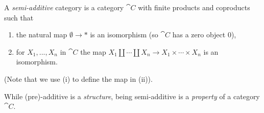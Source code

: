 \documentclass[../main.tex]{subfiles}
\begin{document}
\begin{defn}
	A \emph{semi-additive} category is a category $\cat C$ with finite products and coproducts such that
	\begin{enumerate}
    	\item the natural map $ \emptyset \to *$ is an isomorphism (so $\cat C$ has a zero object $0$),
		\item for $X_1, ..., X_n$ in $\cat C$ the map $X_1 \coprod \cdots \coprod X_n \to X_1 \times \cdots \times X_n$ is an isomorphism.
    \end{enumerate}
	(Note that we use (i) to define the map in (ii)).
\end{defn}

\begin{rmk}
	While (pre)-additive is a \emph{structure}, being semi-additive is a \emph{property} of a category $\cat C$.
\end{rmk}
\end{document}
